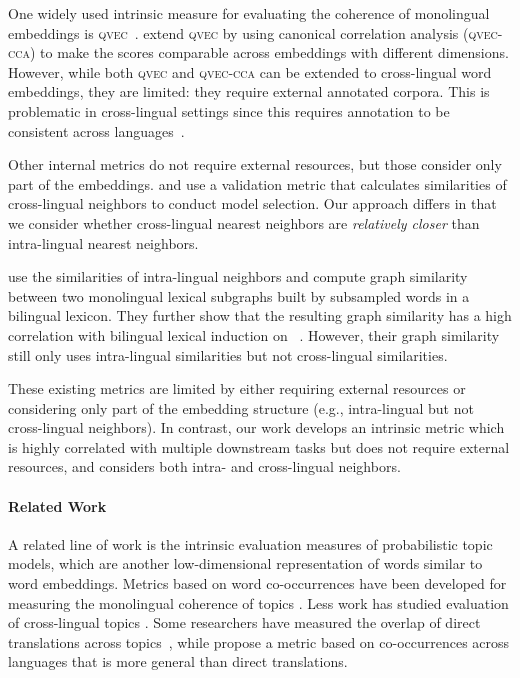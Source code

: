 One widely used intrinsic measure for evaluating the coherence of
monolingual embeddings is \textsc{qvec}~\citep{qvec:enmlp:15}. 
\citet{ammar2016massively} extend \textsc{qvec} by using 
canonical correlation analysis (\textsc{qvec-cca})
to make the scores comparable across
embeddings with different dimensions.
However, while both \textsc{qvec} and \textsc{qvec-cca} can be
extended to cross-lingual word embeddings, they are limited: they require external annotated corpora.  
This is problematic in cross-lingual settings since this requires
annotation to be consistent across
languages~\citep{ammar2016massively}.

Other internal metrics do not require external resources, but those consider only part of the embeddings.
\citet{lample2018word} and \citet{self_learn} use a validation metric
that calculates similarities of cross-lingual neighbors to conduct
model selection.
Our approach differs in that we consider whether cross-lingual nearest neighbors 
are {\it relatively closer} than intra-lingual nearest neighbors.

\citet{eigenval_sim} use the similarities of intra-lingual
neighbors and compute graph similarity between two monolingual
lexical subgraphs built by subsampled words in a bilingual lexicon.
They further show that the resulting graph similarity has a high
correlation with bilingual lexical induction on ~\citep{lample2018word}.
However, their graph similarity still only uses intra-lingual similarities
but not cross-lingual similarities. 

These existing metrics are limited by either requiring external resources
or considering only part of the embedding structure (e.g., intra-lingual but not cross-lingual neighbors).
In contrast, our work develops an intrinsic metric which
 is highly correlated with multiple downstream tasks but does not require external resources,
and considers both intra- and cross-lingual neighbors. 

\paragraph{Related Work}
A related line of work is the intrinsic evaluation measures of probabilistic
topic models, which are another low-dimensional representation of
words similar to word embeddings.  Metrics based on word co-occurrences
have been developed for measuring the monolingual coherence of topics
\citep{NewmanLGB10,MimnoWTLM11,LauNB14}. Less work has studied
evaluation of cross-lingual topics \citep{MimnoWNSM09}. Some
researchers have measured the overlap of direct translations across
topics~\citep{Boyd-Graber:Blei-2009}, while \citet{Hao18mltm} propose
a metric based on co-occurrences across languages that is more general
than direct translations.

